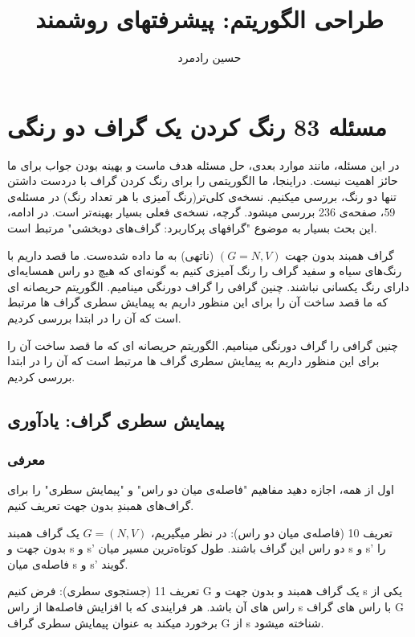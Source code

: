 \documentclass{book} %
\begin{document}
\title{طراحی الگوریتم: پیشرفتهای روشمند}
\author{حسین رادمرد}


\maketitle

\section{مسئله 83 رنگ کردن یک گراف دو رنگی}

در این مسئله، مانند موارد بعدی، حل مسئله هدف ماست و بهینه بودن جواب برای ما حائز اهمیت نیست. دراینجا، ما الگوریتمی را برای رنگ کردن گراف با دردست داشتن تنها دو رنگ، بررسی میکنیم. نسخه‌ی کلی‌تر(رنگ آمیزی با هر تعداد رنگ) در مسئله‌ی 59، صفحه‌ی 236 بررسی میشود. گرچه، نسخه‌ی فعلی بسیار بهینه‌تر است. در ادامه، این بحث بسیار به موضوع "گرافهای پرکاربرد: گراف‌های دوبخشی" مرتبط است.

گراف همبند بدون جهت 
${(G = N, V)}$
 (ناتهی) به ما داده شده‌ست. ما قصد داریم با رنگ‌های سیاه و سفید گراف را رنگ آمیزی کنیم به گونه‌ای که هیچ دو راس همسایه‌ای دارای رنگ یکسانی نباشند. چنین گرافی را گراف دورنگی مینامیم. الگوریتم حریصانه ای که ما قصد ساخت آن را برای این منظور داریم به پیمایش سطری گراف ها مرتبط است که آن را در ابتدا بررسی کردیم.


 چنین گرافی را گراف دورنگی مینامیم. الگوریتم حریصانه ای که ما قصد ساخت آن را برای این منظور داریم به پیمایش سطری گراف ها مرتبط است که آن را در ابتدا بررسی کردیم.
\subsection*{پیمایش سطری گراف: یادآوری}
\subsubsection*{معرفی}

اول از همه، اجازه دهید مفاهیم "فاصله‌ی میان دو راس" و "پیمایش سطری" را برای گراف‌های همبندِ بدون جهت تعریف کنیم.

تعریف 10 (فاصله‌ی میان دو راس):
در نظر میگیریم، $G = (N, V)$ یک گراف همبند بدون جهت و s و s' دو راس این گراف باشند. طول کوتاه‌ترین مسیر میان s و s' را فاصله‌ی میان s و s' گویند.


تعریف 11 (جستجوی سطری):
فرض کنیم G یک گراف همبند و بدون جهت و s یکی از راس های آن باشد. هر فرایندی که با افزایش فاصله‌ها از راس s با راس های گراف G برخورد میکند به عنوان پیمایش سطری گراف G از s شناخته میشود.  
\end{document}
